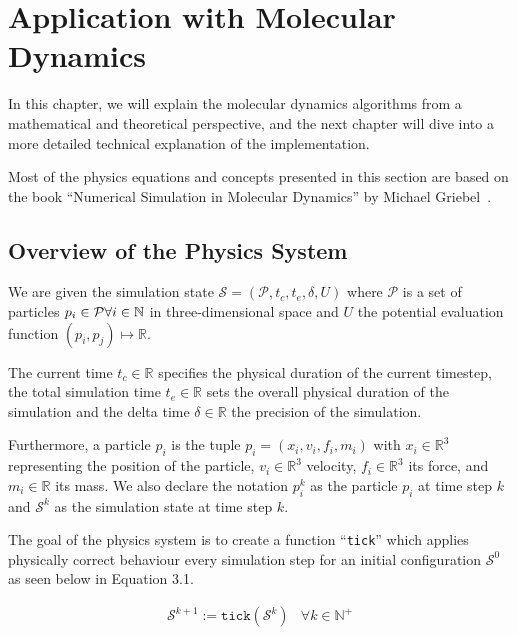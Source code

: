 \documentclass[11pt,
               a4paper,
               bibtotoc,
               idxtotoc,
               headsepline,
               footsepline,
               footexclude,
               BCOR12mm,
               DIV13,
               openany,   %
               ]
               {scrbook}
\begin{document}
\chapter{Application with Molecular Dynamics}

In this chapter, we will explain the molecular dynamics algorithms from a mathematical and theoretical perspective, and the next chapter will dive into a more detailed technical explanation of the implementation.

Most of the physics equations and concepts presented in this section are based on the book ``Numerical Simulation in Molecular Dynamics'' by Michael Griebel~\cite{numerical-simulation}.

\section{Overview of the Physics System}

We are given the simulation state ${\mathcal S} = (\mathcal P, t_c, t_e, \delta, U)$ where $\mathcal P$ is a set of particles $p_i \in \mathcal P\\\forall i \in \mathbb N$ in three-dimensional space and $U$ the potential evaluation function $(p_i, p_j) \mapsto \mathbb R$. 

The current time $t_c \in \mathbb R$ specifies the physical duration of the current timestep, the total simulation time $t_e \in \mathbb R$ sets the overall physical duration of the simulation and the delta time $\delta \in \mathbb R$ the precision of the simulation. 

Furthermore, a particle $p_i$ is the tuple $p_i = (x_i, v_i, f_i, m_i)$ with $x_i \in {\mathbb R}^3$ representing the position of the particle, $v_i \in {\mathbb R}^3$  velocity, $f_i \in {\mathbb R}^3$ its force,
and $m_i \in \mathbb R$ its mass. We also declare the notation $p_i^k$ as the particle $p_i$ at time step $k$ and ${\mathcal S}^k$ as the simulation state at time step $k$.

The goal of the physics system is to create a function ``\texttt{tick}'' which applies physically correct behaviour every simulation step for an initial configuration ${\mathcal S}^0$ as seen below in Equation 3.1.

\begin{align}
{\mathcal S}^{k + 1} := \texttt{tick}\left( {\mathcal S}^k \right)
& \forall k \in {\mathbb N}^+
\end{align}
\end{document}
